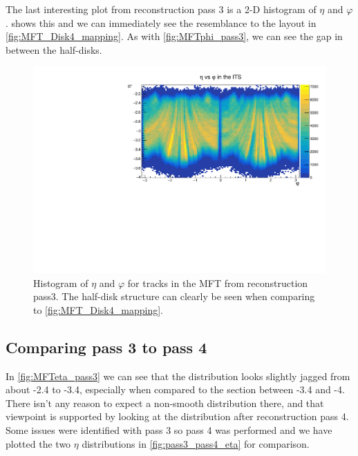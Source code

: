 The last interesting plot from reconstruction pass 3 is a 2-D histogram of $\eta$ and $\varphi$.  shows this and we can immediately see the resemblance to the layout in \cref{fig:MFT_Disk4_mapping}. As with \cref{fig:MFTphi_pass3}, we can see the gap in between the half-disks. 

\begin{figure}[h]
    \begin{center}
        \includegraphics[width=.8\textwidth]{Plots/pass3_MFT/eta_phi_pass3.pdf}
        \caption{Histogram of $\eta$ and $\varphi$ for tracks in the MFT from reconstruction pass3. The half-disk structure can clearly be seen when comparing to \cref{fig:MFT_Disk4_mapping}. }
        \label{fig:eta_phi_pass3}
    \end{center}
\end{figure}

\subsection{Comparing pass 3 to pass 4}\label{sec:Comparing}
In \cref{fig:MFTeta_pass3} we can see that the distribution looks slightly jagged from about -2.4 to -3.4, especially when compared to the section between -3.4 and -4. There isn't any reason to expect a non-smooth distribution there, and that viewpoint is supported by looking at the distribution after reconstruction pass 4. Some issues were identified with pass 3 so pass 4 was performed and we have plotted the two $\eta$ distributions in \cref{fig:pass3_pass4_eta} for comparison.

